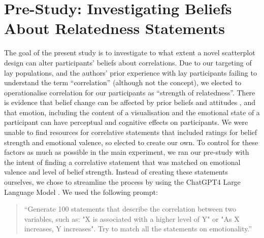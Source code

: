 \documentclass[sigconf]{acmart}
\begin{document}
\section{Pre-Study: Investigating Beliefs About Relatedness
Statements}\label{sec-pre-study}

The goal of the present study is to investigate to what extent a novel
scatterplot design can alter participants' beliefs about correlations.
Due to our targeting of lay populations, and the authors' prior
experience with lay participants failing to understand the term
``correlation'' (although not the concept), we elected to operationalise
correlation for our participants as ``strength of relatedness''. There
is evidence that belief change can be affected by prior beliefs and
attitudes \citep{xiong_2022, markant_2023}, and that emotion, including
the content of a visualisation \citep{phelps_2006, harrison_2013} and
the emotional state of a participant \citep{thoresen_2016} can have
perceptual and cognitive effects on participants. We were unable to find
resources for correlative statements that included ratings for belief
strength and emotional valence, so elected to create our own. To control
for these factors as much as possible in the main experiment, we ran our
pre-study with the intent of finding a correlative statement that was
matched on emotional valence and level of belief strength. Instead of
creating these statements ourselves, we chose to streamline the process
by using the ChatGPT4 Large Language Model \citep{chat_gpt}. We used the
following prompt:

\begin{quotation}
    ``Generate 100 statements that describe the correlation between two variables, such as:
     "X is associated with a higher level of Y" or
     "As X increases, Y increases".
    Try to match all the statements on emotionality.''
    
\end{quotation}
\end{document}

